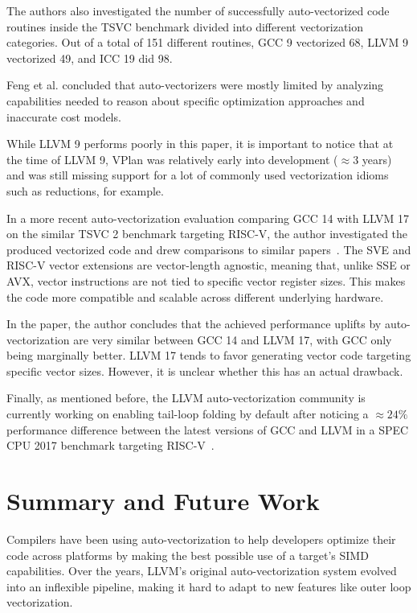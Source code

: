 \documentclass[sigplan,11pt,nonacm]{acmart}
\begin{document}
The authors also investigated the number of successfully auto-vectorized code routines inside the TSVC 
benchmark divided into different vectorization categories. Out of a total of 151 different routines, GCC 9 
vectorized 68, LLVM 9 vectorized 49, and ICC 19 did 98.

Feng et al. concluded that auto-vectorizers were mostly limited by analyzing capabilities 
needed to reason about specific optimization approaches and inaccurate cost models.

While LLVM 9 performs poorly in this paper, it is important to notice that at the time of LLVM 9, VPlan was relatively 
early into development ($\approx3$ years) and was still missing 
support for a lot of commonly used vectorization idioms such as reductions, for example.

In a more recent auto-vectorization evaluation comparing GCC 14 with LLVM 17 on the similar TSVC 2 
benchmark targeting RISC-V, the author investigated the produced vectorized code 
and drew comparisons to similar papers~\cite{gccllvmveccomp}. The SVE and RISC-V 
vector extensions are  
vector-length agnostic, 
meaning that, unlike SSE or AVX, vector instructions are not tied to specific vector register sizes. 
This makes the code more compatible and scalable across different underlying hardware. 

In the paper, the author concludes that the achieved performance uplifts by auto-vectorization are very 
similar between GCC 14 and LLVM 17, with GCC only being marginally better. LLVM 17 tends to favor 
generating vector code targeting specific vector sizes. However, it is unclear whether this has an 
actual drawback.

Finally, as mentioned before, the LLVM auto-vectorization community is currently working on 
enabling tail-loop folding by default after noticing a $\approx24\%$ performance difference between the latest 
versions of GCC and LLVM in a SPEC CPU 2017 benchmark targeting RISC-V~\cite{riscvtailfolding}. 




\section{Summary and Future Work}
\label{sec:summary}
Compilers have been using auto-vectorization to help developers optimize their code 
across platforms by making the best possible use of a target's SIMD capabilities. Over the years, 
LLVM's original auto-vectorization system evolved into an inflexible pipeline, making it hard 
to adapt to new features like outer loop vectorization.
\end{document}
